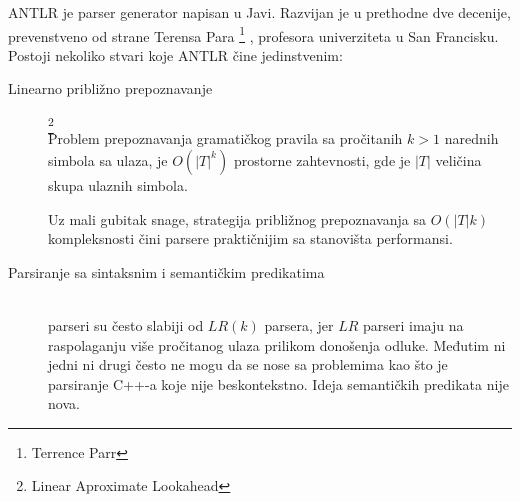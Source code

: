 ANTLR je parser generator napisan u Javi. 
Razvijan je u prethodne dve decenije, prevenstveno od strane Terensa Para
\footnote{Terrence Parr}
, profesora univerziteta u San Francisku. Postoji nekoliko stvari koje ANTLR čine jedinstvenim\cite{antlr-contrib}:

\begin{description}

	\item[Linearno približno prepoznavanje]\footnote{\eng Linear Aproximate Lookahead} \hfill \\
	Problem prepoznavanja gramatičkog pravila sa pročitanih $k > 1$ narednih simbola sa ulaza, je $O(|T|^{k})$ prostorne zahtevnosti, gde je $|T|$ veličina skupa ulaznih simbola. 
	
	Uz mali gubitak snage, strategija približnog prepoznavanja sa $O(|T|k)$ kompleksnosti čini \LLk parsere praktičnijim sa stanovišta performansi.
	\item[Parsiranje sa sintaksnim i semantičkim predikatima] \hfill \\
	\LLk parseri su često slabiji od $LR(k)$ parsera, jer $LR$ parseri imaju na raspolaganju više pročitanog ulaza prilikom donošenja odluke. Međutim ni jedni ni drugi često ne mogu da se nose sa problemima kao što je parsiranje C++-a koje nije beskontekstno. Ideja semantičkih predikata nije nova\cite{attributed-transations}.




\end{description}
